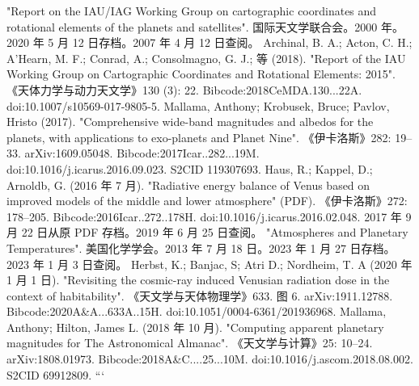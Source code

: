 \begin{enumerate}
"Report on the IAU/IAG Working Group on cartographic coordinates and rotational elements of the planets and satellites". 国际天文学联合会。2000 年。2020 年 5 月 12 日存档。2007 年 4 月 12 日查阅。  
Archinal, B. A.; Acton, C. H.; A'Hearn, M. F.; Conrad, A.; Consolmagno, G. J.; 等 (2018). "Report of the IAU Working Group on Cartographic Coordinates and Rotational Elements: 2015". 《天体力学与动力天文学》130 (3): 22. Bibcode:2018CeMDA.130...22A. doi:10.1007/s10569-017-9805-5.  
Mallama, Anthony; Krobusek, Bruce; Pavlov, Hristo (2017). "Comprehensive wide-band magnitudes and albedos for the planets, with applications to exo-planets and Planet Nine". 《伊卡洛斯》282: 19–33. arXiv:1609.05048. Bibcode:2017Icar..282...19M. doi:10.1016/j.icarus.2016.09.023. S2CID 119307693.  
Haus, R.; Kappel, D.; Arnoldb, G. (2016 年 7 月). "Radiative energy balance of Venus based on improved models of the middle and lower atmosphere" (PDF). 《伊卡洛斯》272: 178–205. Bibcode:2016Icar..272..178H. doi:10.1016/j.icarus.2016.02.048. 2017 年 9 月 22 日从原 PDF 存档。2019 年 6 月 25 日查阅。  
"Atmospheres and Planetary Temperatures". 美国化学学会。2013 年 7 月 18 日。2023 年 1 月 27 日存档。2023 年 1 月 3 日查阅。  
Herbst, K.; Banjac, S; Atri D.; Nordheim, T. A (2020 年 1 月 1 日). "Revisiting the cosmic-ray induced Venusian radiation dose in the context of habitability". 《天文学与天体物理学》633. 图 6. arXiv:1911.12788. Bibcode:2020A&A...633A..15H. doi:10.1051/0004-6361/201936968.  
Mallama, Anthony; Hilton, James L. (2018 年 10 月). "Computing apparent planetary magnitudes for The Astronomical Almanac". 《天文学与计算》25: 10–24. arXiv:1808.01973. Bibcode:2018A&C....25...10M. doi:10.1016/j.ascom.2018.08.002. S2CID 69912809.
```

\end{enumerate}